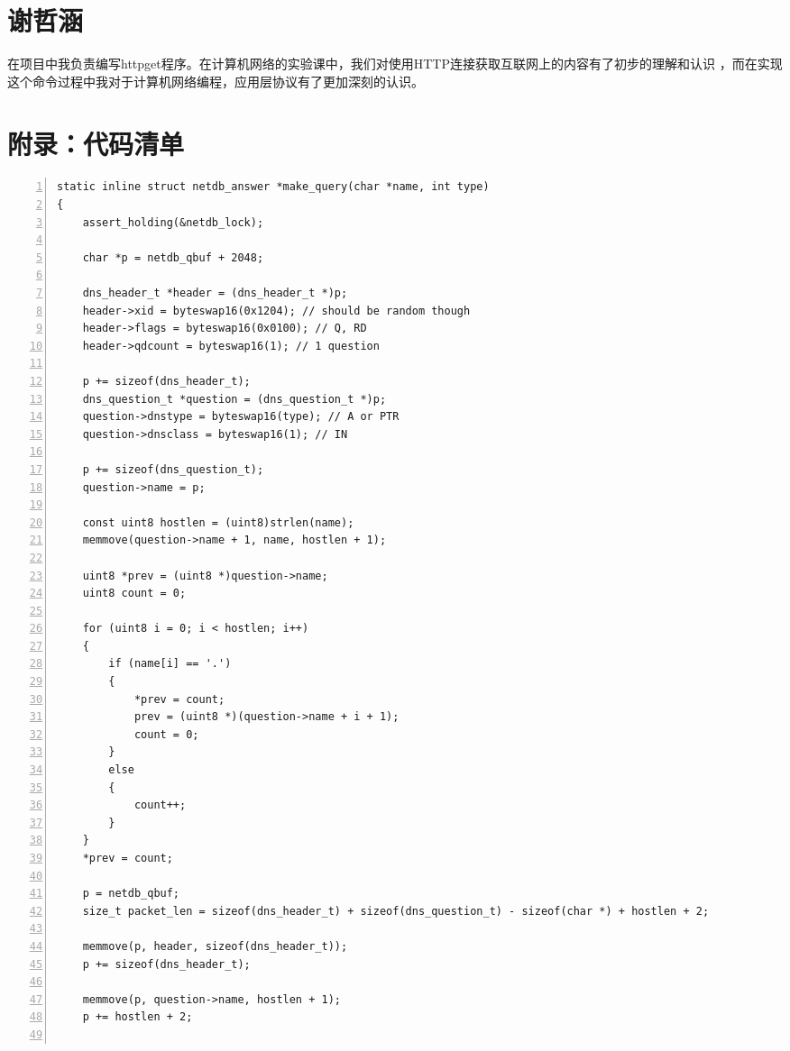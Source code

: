 \documentclass[a4paper,twoside]{ctexrep}
\begin{document}
\begin{spacing}{1.2}
\section{谢哲涵}

在项目中我负责编写httpget程序。在计算机网络的实验课中，我们对使用HTTP连接获取互联网上的内容有了初步的理解和认识
，而在实现这个命令过程中我对于计算机网络编程，应用层协议有了更加深刻的认识。

\clearpage
{}




\clearpage
\section*{附录：代码清单}
\label{sec:appdixcode}

\begin{lstlisting}[numbers=left,style=CppStyle,caption={DNS报文构造},label={code:dnsquery}]
static inline struct netdb_answer *make_query(char *name, int type)
{
	assert_holding(&netdb_lock);

	char *p = netdb_qbuf + 2048;

	dns_header_t *header = (dns_header_t *)p;
	header->xid = byteswap16(0x1204); // should be random though
	header->flags = byteswap16(0x0100); // Q, RD
	header->qdcount = byteswap16(1); // 1 question

	p += sizeof(dns_header_t);
	dns_question_t *question = (dns_question_t *)p;
	question->dnstype = byteswap16(type); // A or PTR
	question->dnsclass = byteswap16(1); // IN

	p += sizeof(dns_question_t);
	question->name = p;

	const uint8 hostlen = (uint8)strlen(name);
	memmove(question->name + 1, name, hostlen + 1);

	uint8 *prev = (uint8 *)question->name;
	uint8 count = 0;

	for (uint8 i = 0; i < hostlen; i++)
	{
		if (name[i] == '.')
		{
			*prev = count;
			prev = (uint8 *)(question->name + i + 1);
			count = 0;
		}
		else
		{
			count++;
		}
	}
	*prev = count;

	p = netdb_qbuf;
	size_t packet_len = sizeof(dns_header_t) + sizeof(dns_question_t) - sizeof(char *) + hostlen + 2;

	memmove(p, header, sizeof(dns_header_t));
	p += sizeof(dns_header_t);

	memmove(p, question->name, hostlen + 1);
	p += hostlen + 2;


\end{lstlisting}
\end{spacing}
\end{document}
